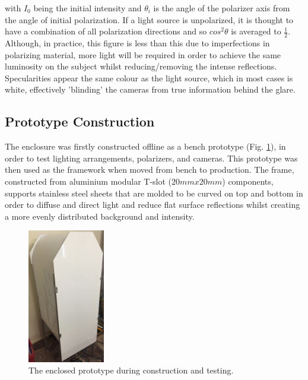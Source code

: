 \documentclass[fleqn,twoside]{article}
\begin{document}
with $I_{0}$ being the initial intensity and $\theta_{i}$ is the angle of the polarizer axis from the angle of initial polarization. If a light source is unpolarized, it is thought to have a combination of all polarization directions and so $cos^{2}\theta$ is averaged to $\frac{1}{2}$. Although, in practice, this figure is less than this due to imperfections in polarizing material, more light will be required in order to achieve the same luminosity on the subject \cite{rox, sommer} whilst reducing/removing the intense reflections. Specularities appear the same colour as the light source, which in most cases is white, effectively 'blinding' the cameras from true information behind the glare.  






\subsection{Prototype Construction}

The enclosure was firstly constructed offline as a bench prototype (Fig. \ref{fig:bench_construct}), in order to test lighting arrangements, polarizers, and cameras. This prototype was then used as the framework when moved from bench to production. The frame, constructed from aluminium modular T-slot ($20mmx20mm$) components, supports stainless steel sheets that are molded to be curved on top and bottom in order to diffuse and direct light and reduce flat surface reflections whilst creating a more evenly distributed background and intensity. 


\begin{figure}
	\begin{center}
		\includegraphics[width=0.3\textwidth]{images/bench_construct.jpg}
	\end{center}
	\caption{The enclosed prototype during construction and testing.}
	\label{fig:bench_construct}
\end{figure}   
\end{document}
